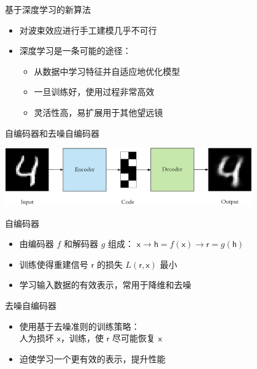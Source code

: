 \documentclass{beamer}
\newcommand{\B}[1]{\bm{\mathsf{#1}}}  %
\begin{document}
\begin{frame}{基于深度学习的新算法}
  \begin{itemize}
    \item 对波束效应进行手工建模几乎不可行
    \item \alert{深度学习}是一条可能的途径：
      \begin{itemize}
        \item 从数据中学习特征并自适应地优化模型
        \item 一旦训练好，使用过程非常高效
        \item 灵活性高，易扩展用于其他望远镜
      \end{itemize}
  \end{itemize}
  \vspace{-1ex}
\end{frame}

\begin{frame}{自编码器和去噪自编码器}
  \begin{center}
    \includegraphics[width=0.8\textwidth]{autoencoder}
  \end{center}
  \vspace{-1ex}
  \begin{alertblock}{自编码器}
    \vspace{-1ex}
    \begin{itemize}
      \item 由编码器 $f$ 和解码器 $g$ 组成：
        $\B{x} \rightarrow \B{h} = f(\B{x}) \rightarrow \B{r} = g(\B{h})$
      \item 训练使得重建信号 $\B{r}$ 的损失 $L(\B{r}, \B{x})$ 最小
      \item 学习输入数据的有效表示，常用于降维和去噪
    \end{itemize}
  \end{alertblock}
  \begin{alertblock}{去噪自编码器}
    \vspace{-1ex}
    \begin{itemize}
      \item 使用基于\alert{去噪准则}的训练策略：\\
        人为损坏 $\B{x}$，训练，使 $\B{r}$ 尽可能恢复 $\B{x}$
      \item 迫使学习一个更有效的表示，提升性能
    \end{itemize}
  \end{alertblock}
\end{frame}
\end{document}
